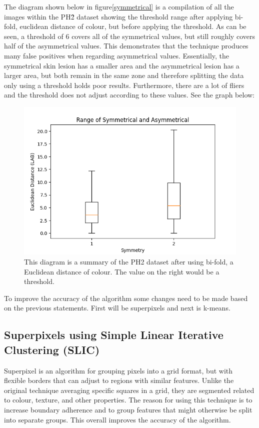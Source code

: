 The diagram shown below in figure\ref{symmetrical} is a compilation of all the images within the PH\^2 dataset showing the threshold range after applying bi-fold, euclidean distance of colour, but before applying the threshold. As can be seen, a threshold of 6 covers all of the symmetrical values, but still roughly covers half of the asymmetrical values. This demonstrates that the technique produces many false positives when regarding asymmetrical values.
Essentially, the symmetrical skin lesion has a smaller area and the asymmetrical lesion has a larger area, but both remain in the same zone and therefore splitting the data only using a threshold holds poor results. Furthermore, there are a lot of fliers and the threshold does not adjust according to these values. See the graph below:

\begin{figure} 
    \centering
    \includegraphics[scale=0.6]{images/symmetrical.png}
\caption{This diagram is a summary of the PH2 dataset after using bi-fold, a Euclidean distance of colour. The value on the right would be a threshold.}
\end{figure}\label{symmetrical}
    
To improve the accuracy of the algorithm some changes need to be made based on the previous statements. First will be superpixels and next is k-means.

\subsection{Superpixels using Simple Linear Iterative Clustering (SLIC)}
Superpixel is an algorithm for grouping pixels into a grid format, but with flexible borders that can adjust to regions with similar features. Unlike the original technique averaging specific squares in a grid\cite{Kasmi2016}, they are segmented related to colour, texture, and other properties. The reason for using this technique is to increase boundary adherence and to group features that might otherwise be split into separate groups. This overall improves the accuracy of the algorithm.

